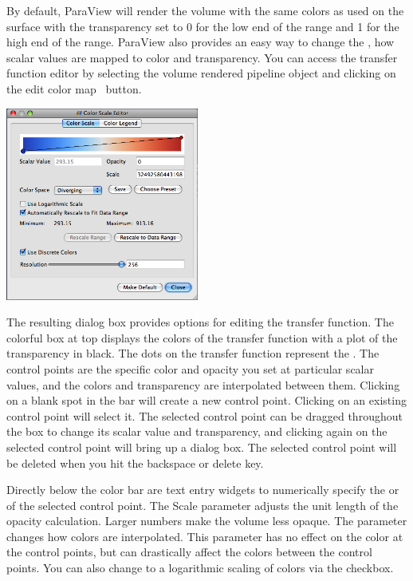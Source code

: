By default, ParaView will render the volume with the same colors as used on
the surface with the transparency set to 0 for the low end of the range and
1 for the high end of the range.  ParaView also provides an easy way to
change the , how scalar values are mapped to
color and transparency.  You can access the transfer function editor by
selecting the volume rendered pipeline object and clicking on the edit
color map~ button.

\begin{inlinefig}
  \includegraphics[width=2.5in]{images/ColorScaleEditor}
\end{inlinefig}

The resulting dialog box provides options for editing the transfer
function.  The colorful box at top displays the colors of the transfer
function with a plot of the transparency in black.  The dots on the
transfer function represent the .  The control
points are the specific color and opacity you set at particular scalar
values, and the colors and transparency are interpolated between them.
Clicking on a blank spot in the bar will create a new control point.
Clicking on an existing control point will select it.  The selected control
point can be dragged throughout the box to change its scalar value and
transparency, and clicking again on the selected control point will bring
up a dialog box.  The selected control point will be deleted when you hit
the backspace or delete key.

Directly below the color bar are text entry widgets to numerically specify
the  or  of the selected control point.  The
Scale parameter adjusts the unit length of the opacity calculation.  Larger
numbers make the volume less opaque.  The  parameter
changes how colors are interpolated.  This parameter has no effect on the
color at the control points, but can drastically affect the colors between
the control points.  You can also change to a logarithmic scaling of colors
via the  checkbox.

